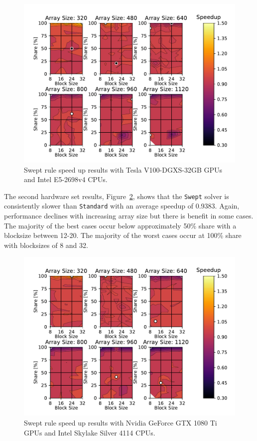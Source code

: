 \documentclass[review]{elsarticle}
\def\oldCPU{s}
\def\oldGPU{s}
\def\newCPU{s}
\def\newGPU{s}
\def\Swept{\texttt{Swept}}
\def\Standard{\texttt{Standard}}
\def\oldCPU{Intel Skylake Silver 4114} %
\def\oldGPU{Nvidia GeForce GTX 1080 Ti}
\def\newCPU{Intel E5-2698v4} %
\def\newGPU{Tesla V100-DGXS-32GB}
\begin{document}
\begin{figure}[htb!]
    \centering
    \includegraphics[scale=0.7]{figs/speedUpeulerNew.pdf}
    \caption{Swept rule speed up results with \newGPU{} GPUs and \newCPU{} CPUs.}
    \label{fig:newSpeedupEuler}
\end{figure}

The second hardware set results, Figure~\ref{fig:oldSpeedupEuler}, shows that the \Swept{} solver is consistently slower than \Standard{} with an average speedup of 0.9383. Again, performance declines with increasing array size but there is benefit in some cases. The majority of the best cases occur below approximately 50\% share with a blocksize between 12-20. The majority of the worst cases occur at 100\% share with blocksizes of 8 and 32.

\begin{figure}[htb!]
    \centering
    \includegraphics[scale=0.7]{figs/speedUpeulerOld.pdf}
    \caption{Swept rule speed up results with \oldGPU{} GPUs and \oldCPU{} CPUs.}
    \label{fig:oldSpeedupEuler}
\end{figure}
\end{document}
